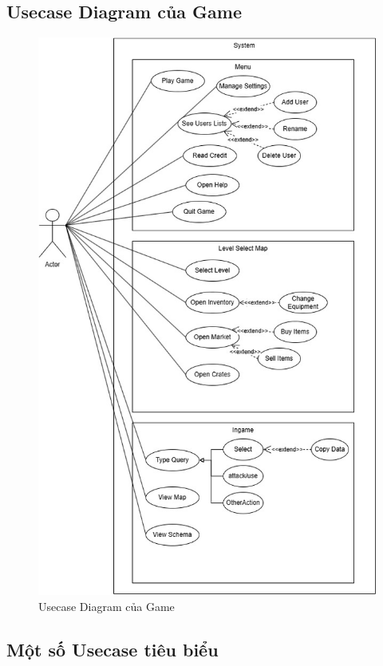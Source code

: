 \subsection{Usecase Diagram của Game}
\begin{figure}[H]
	\centering
	\includegraphics[width=14cm]{Images/UCD.jpg}
	\vspace{0.5cm}
	\caption{Usecase Diagram của Game}
\end{figure}
\subsection{Một số Usecase tiêu biểu}
